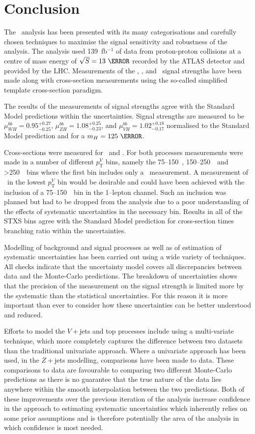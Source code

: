 \chapter{Conclusion}%
\label{ch:conclusion}
The \VHbb\ analysis has been presented with its many categorisations and
carefully chosen techniques to maximise the signal sensitivity and robustness of
the analysis. The analysis used 139~fb$^{-1}$ of data from proton-proton
collisions at a centre of mass energy of $\sqrt{S} = 13~\TeV$ recorded by the
ATLAS detector and provided by the LHC. Measurements of the \WH, \ZH, and \VH\
signal strengths have been made along with cross-section measurements using the
so-called simplified template cross-section paradigm.

The results of the measurements of signal strengths agree with the Standard
Model predictions within the uncertainties. Signal strengths are measured to be
$\mu_{W\!H}^{bb} = 0.95^{+0.27}_{-0.25}$, $\mu_{Z\!H}^{bb} =
1.08^{+0.25}_{-0.23}$, and $\mu_{V\!H}^{bb} = 1.02^{+0.18}_{-0.17}$ normalised
to the Standard Model prediction and for a $m_H = 125~\GeV$.

Cross-sections were measured for \WH\ and \ZH. For both processes measurements
were made in a number of different $p_{\mathrm{T}}^{V}$ bins, namely the
75--150~\GeV, 150--250~\GeV\ and >250~\GeV\ bins where the first bin includes
only a \ZH\ measurement. A measurement of \WH\ in the lowest
$p_{\mathrm{T}}^{V}$ bin would be desirable and could have been achieved with
the inclusion of a 75--150~\GeV\ bin in the 1--lepton channel. Such an inclusion
was planned but had to be dropped from the analysis due to a poor understanding
of the effects of systematic uncertainties in the necessary bin. Results in all
of the STXS bins agree with the Standard Model prediction for cross-section
times branching ratio within the uncertainties.

Modelling of background and signal processes as well as of estimation of
systematic uncertainties has been carried out using a wide variety of
techniques. All checks indicate that the uncertainty model covers all
discrepancies between data and the Monte-Carlo predictions. The breakdown of
uncertainties shows that the precision of the measurement on the signal strength
is limited more by the systematic than the statistical uncertainties. For this
reason it is more important than ever to consider how these uncertainties can be
better understood and reduced.

Efforts to model the $V+$jets and top processes include using a multi-variate
technique, which more completely captures the difference between two datasets
than the traditional univariate approach. Where a univariate approach has
been used, in the $Z+$jets modelling, comparisons have been made to data. These
comparisons to data are favourable to comparing two different Monte-Carlo
predictions as there is no guarantee that the true nature of the data lies
anywhere within the smooth interpolation between the two predictions. Both of
these improvements over the previous iteration of the analysis increase
confidence in the approach to estimating systematic uncertainties which
inherently relies on some prior assumptions and is therefore potentially the
area of the analysis in which confidence is most needed.

